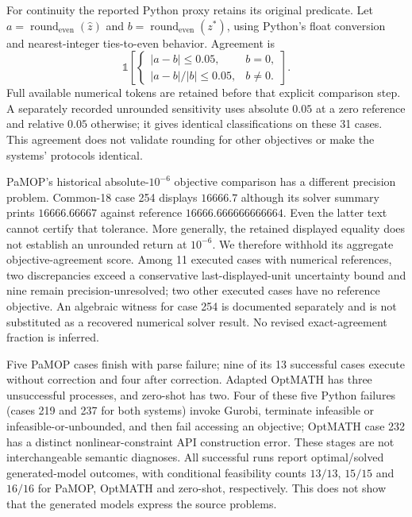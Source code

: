 \documentclass[pdflatex,sn-basic,Numbered]{sn-jnl}
\begin{document}
For continuity the reported Python proxy retains its original predicate. Let $a=\operatorname{round}_{\mathrm{even}}(\hat z)$ and $b=\operatorname{round}_{\mathrm{even}}(z^*)$, using Python's float conversion and nearest-integer ties-to-even behavior. Agreement is
\begin{equation}
 \mathbb{1}\!\left[\begin{cases}|a-b|\leq0.05,&b=0,\\ |a-b|/|b|\leq0.05,&b\ne0.\end{cases}\right].
 \label{eq:common18-objective-proxy}
\end{equation}
Full available numerical tokens are retained before that explicit comparison step. A separately recorded unrounded sensitivity uses absolute $0.05$ at a zero reference and relative $0.05$ otherwise; it gives identical classifications on these 31 cases. This agreement does not validate rounding for other objectives or make the systems' protocols identical.

PaMOP's historical absolute-$10^{-6}$ objective comparison has a different precision problem. Common-18 case 254 displays $16666.7$ although its solver summary prints $16666.66667$ against reference $16666.666666666664$. Even the latter text cannot certify that tolerance. More generally, the retained displayed equality does not establish an unrounded return at $10^{-6}$. We therefore withhold its aggregate objective-agreement score. Among 11 executed cases with numerical references, two discrepancies exceed a conservative last-displayed-unit uncertainty bound and nine remain precision-unresolved; two other executed cases have no reference objective. An algebraic witness for case 254 is documented separately and is not substituted as a recovered numerical solver result. No revised exact-agreement fraction is inferred.

Five PaMOP cases finish with parse failure; nine of its 13 successful cases execute without correction and four after correction. Adapted OptMATH has three unsuccessful processes, and zero-shot has two. Four of these five Python failures (cases 219 and 237 for both systems) invoke Gurobi, terminate infeasible or infeasible-or-unbounded, and then fail accessing an objective; OptMATH case 232 has a distinct nonlinear-constraint API construction error. These stages are not interchangeable semantic diagnoses. All successful runs report optimal/solved generated-model outcomes, with conditional feasibility counts $13/13$, $15/15$ and $16/16$ for PaMOP, OptMATH and zero-shot, respectively. This does not show that the generated models express the source problems.
\end{document}
